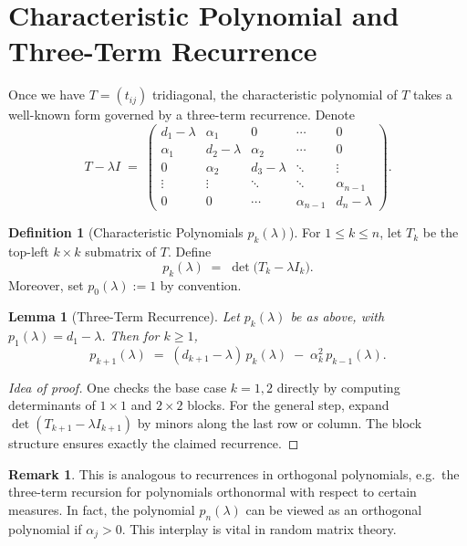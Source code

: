\documentclass[letterpaper,11pt,oneside,reqno]{article}
\numberwithin{equation}{section}
\newtheorem{lemma}[proposition]{Lemma}
\theoremstyle{definition}
\newtheorem{definition}[proposition]{Definition}
\newtheorem{remark}[proposition]{Remark}
\begin{document}
\section{Characteristic Polynomial and Three-Term Recurrence}
\label{sec:3term}

Once we have $T = (t_{ij})$ tridiagonal, the characteristic polynomial of $T$ takes a well-known form governed by a three-term recurrence. Denote
\[
  T - \lambda I \;=\;
  \begin{pmatrix}
    d_1 - \lambda & \alpha_1 & 0 & \cdots & 0 \\
    \alpha_1 & d_2 - \lambda & \alpha_2 & \cdots & 0 \\
    0        & \alpha_2 & d_3 - \lambda & \ddots & \vdots \\
    \vdots   & \vdots   & \ddots & \ddots & \alpha_{n-1} \\
    0        & 0        & \cdots & \alpha_{n-1} & d_n - \lambda
  \end{pmatrix}.
\]

\begin{definition}[Characteristic Polynomials $p_k(\lambda)$]
For $1 \le k \le n$, let $T_k$ be the top-left $k \times k$ submatrix of $T$. Define
\[
  p_k(\lambda) \;=\; \det\bigl(T_k - \lambda I_k\bigr).
\]
Moreover, set $p_0(\lambda):=1$ by convention.
\end{definition}

\begin{lemma}[Three-Term Recurrence]
\label{lem:3term-recurrence}
Let $p_k(\lambda)$ be as above, with $p_1(\lambda) = d_1 - \lambda$. Then for $k \ge 1$,
\[
  p_{k+1}(\lambda)
  \;=\;
  (d_{k+1} - \lambda)\,p_k(\lambda)
  \;-\;\alpha_k^2\,p_{k-1}(\lambda).
\]
\end{lemma}

\begin{proof}[Idea of proof]
One checks the base case $k=1,2$ directly by computing determinants of $1\times1$ and $2\times2$ blocks. For the general step, expand $\det(T_{k+1}-\lambda I_{k+1})$ by minors along the last row or column. The block structure ensures exactly the claimed recurrence.
\end{proof}

\begin{remark}
This is analogous to recurrences in orthogonal polynomials, e.g.\ the three-term recursion for polynomials orthonormal with respect to certain measures. In fact, the polynomial $p_n(\lambda)$ can be viewed as an orthogonal polynomial if $\alpha_j>0$. This interplay is vital in random matrix theory.
\end{remark}
\end{document}
